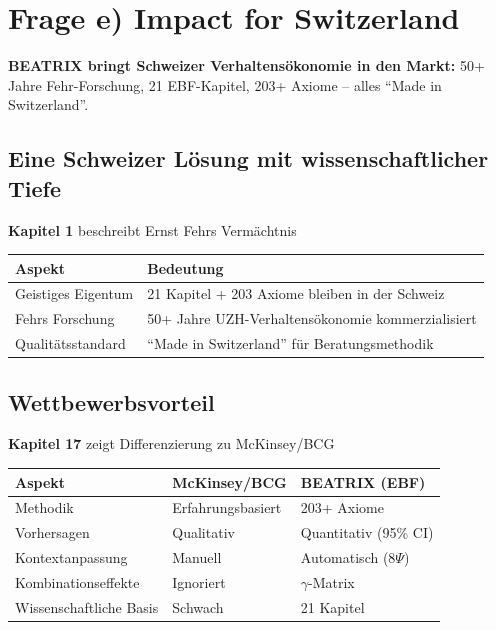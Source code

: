 \documentclass[11pt,a4paper]{article}
\begin{document}
\section{Frage e) Impact for Switzerland}

\begin{keyinsight}
\textbf{BEATRIX bringt Schweizer Verhaltensökonomie in den Markt:} 50+ Jahre Fehr-Forschung, 21 EBF-Kapitel, 203+ Axiome -- alles ``Made in Switzerland''.
\end{keyinsight}

\subsection{Eine Schweizer Lösung mit wissenschaftlicher Tiefe}

\begin{ebfbox}
\textbf{Kapitel 1} beschreibt Ernst Fehrs Vermächtnis
\end{ebfbox}

\begin{center}
\begin{tabular}{ll}
\toprule
\textbf{Aspekt} & \textbf{Bedeutung} \\
\midrule
Geistiges Eigentum & 21 Kapitel + 203 Axiome bleiben in der Schweiz \\
Fehrs Forschung & 50+ Jahre UZH-Verhaltensökonomie kommerzialisiert \\
Qualitätsstandard & ``Made in Switzerland'' für Beratungsmethodik \\
\bottomrule
\end{tabular}
\end{center}

\subsection{Wettbewerbsvorteil}

\begin{ebfbox}
\textbf{Kapitel 17} zeigt Differenzierung zu McKinsey/BCG
\end{ebfbox}

\begin{center}
\begin{tabular}{lll}
\toprule
\textbf{Aspekt} & \textbf{McKinsey/BCG} & \textbf{BEATRIX (EBF)} \\
\midrule
Methodik & Erfahrungsbasiert & 203+ Axiome \\
Vorhersagen & Qualitativ & Quantitativ (95\% CI) \\
Kontextanpassung & Manuell & Automatisch (8$\Psi$) \\
Kombinationseffekte & Ignoriert & $\gamma$-Matrix \\
Wissenschaftliche Basis & Schwach & 21 Kapitel \\
\bottomrule
\end{tabular}
\end{center}
\end{document}
